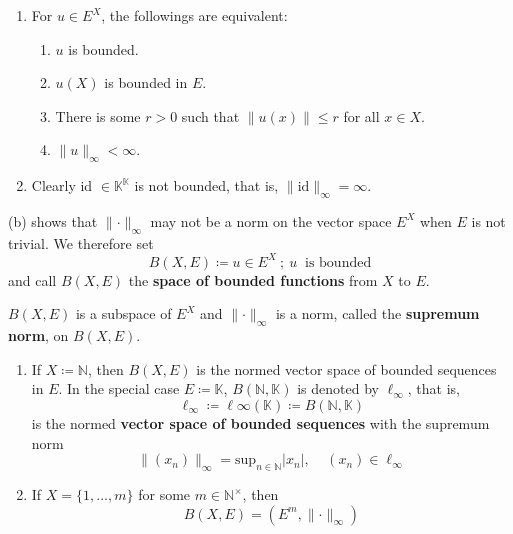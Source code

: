 \begin{remark}
    \begin{enumerate}[label=(\alph*)]
        \item For \(u \in E^X\), the followings are equivalent:
        \begin{enumerate}[label=(\roman*)]
            \item \(u\) is bounded. 
            \item \(u\left(X\right)\) is bounded in \(E\). 
            \item There is some \(r > 0\) such that \(\lVert u\left(x\right) \rVert \leq r\)
            for all \(x \in X\). 
            \item \(\lVert u \rVert_\infty < \infty\). 
        \end{enumerate}
        \item Clearly id \(\in \mathbb{K}^\mathbb{K}\) is not bounded, that is, 
        \(\lVert \text{id} \rVert_\infty = \infty\). 
    \end{enumerate}
    (b) shows that \(\lVert \cdot \rVert_\infty \) may not be a norm on the vector space
    \(E^X\) when \(E\) is not trivial. We therefore set
    \[
        B(X,E) \coloneqq {u \in E^X \: ; \: u \: \text{ is bounded}}  
    \]
    and call \(B\left(X, E\right)\) the \textbf{space of bounded functions} from \(X\) to \(E\). 
\end{remark}

\begin{proposition}
    \(B\left(X, E\right)\) is a subspace of \(E^X\) and \(\lVert \cdot \rVert_\infty \) is a norm,
    called the \textbf{supremum norm}, on \(B\left(X, E\right)\). 
\end{proposition}

\begin{remark}
    \begin{enumerate}[label=(\alph*)]
        \item If \(X\coloneqq \mathbb{N}\), then \(B\left(X, E\right)\) is the normed vector
        space of bounded sequences in \(E\). In the special case \(E\coloneqq \mathbb{K}\),
        \(B\left(\mathbb{N}, \mathbb{K}\right)\) is denoted by \(\ell_\infty\), that is, 
        \[
            \ell_\infty \coloneqq \ell\infty(\mathbb{K}) \coloneqq B(\mathbb{N}, \mathbb{K}) 
        \]
        is the normed \textbf{vector space of bounded sequences} with the supremum norm
        \[
            \lVert (x_n) \rVert_\infty = \displaystyle\text{sup}_{n\in \mathbb{N}} \lvert x_n \rvert
            , \:\:\:\:\: (x_n) \in \ell_\infty  
        \]
        \item If \(X = \{1,\ldots,m\}\) for some \(m \in \mathbb{N}^\times\), then
        \[
            B(X,E) = (E^m, \lVert \cdot \rVert_\infty)  
        \]
    \end{enumerate}
\end{remark}

